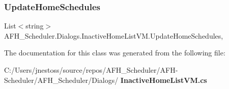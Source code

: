 \mbox{\label{class_a_f_h___scheduler_1_1_dialogs_1_1_inactive_home_list_v_m_aeae85a0a0f0e749600ccccb6a5201e90}} 
\subsubsection{UpdateHomeSchedules}
{\footnotesize\ttfamily List$<$string$>$ A\+F\+H\+\_\+\+Scheduler.\+Dialogs.\+Inactive\+Home\+List\+V\+M.\+Update\+Home\+Schedules\hspace{0.3cm}{\ttfamily [get]}, {\ttfamily [set]}}



The documentation for this class was generated from the following file\+:\begin{DoxyCompactItemize}
\item 
C\+:/\+Users/jnestoss/source/repos/\+A\+F\+H\+\_\+\+Scheduler/\+A\+F\+H-\/\+Scheduler/\+A\+F\+H\+\_\+\+Scheduler/\+Dialogs/\textbf{ Inactive\+Home\+List\+V\+M.\+cs}\end{DoxyCompactItemize}
